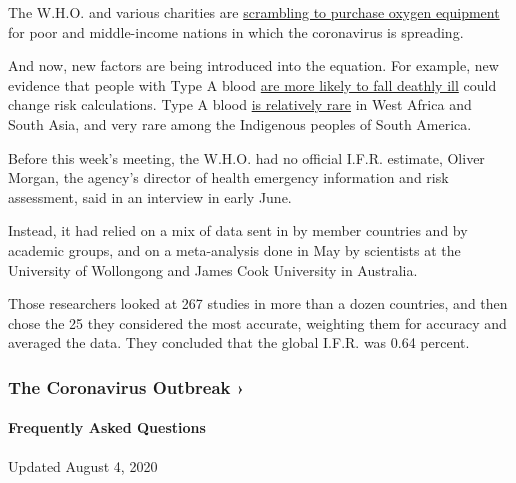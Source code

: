 The W.H.O. and various charities are
\href{https://www.nytimes3xbfgragh.onion/2020/06/23/health/coronavirus-oxygen-africa.html}{scrambling
to purchase oxygen equipment} for poor and middle-income nations in
which the coronavirus is spreading.

And now, new factors are being introduced into the equation. For
example, new evidence that people with Type A blood
\href{https://www.nytimes3xbfgragh.onion/2020/06/03/health/coronavirus-blood-type-genetics.html}{are
more likely to fall deathly ill} could change risk calculations. Type A
blood
\href{https://en.wikipedia.org/wiki/Blood_type_distribution_by_country}{is
relatively rare} in West Africa and South Asia, and very rare among the
Indigenous peoples of South America.

Before this week's meeting, the W.H.O. had no official I.F.R. estimate,
Oliver Morgan, the agency's director of health emergency information and
risk assessment, said in an interview in early June.

Instead, it had relied on a mix of data sent in by member countries and
by academic groups, and on a meta-analysis done in May by scientists at
the University of Wollongong and James Cook University in Australia.

Those researchers looked at 267 studies in more than a dozen countries,
and then chose the 25 they considered the most accurate, weighting them
for accuracy and averaged the data. They concluded that the global
I.F.R. was 0.64 percent.

\href{https://www.nytimes3xbfgragh.onion/news-event/coronavirus?action=click\&pgtype=Article\&state=default\&region=MAIN_CONTENT_3\&context=storylines_faq}{}

\hypertarget{the-coronavirus-outbreak-}{%
\subsubsection{The Coronavirus Outbreak
›}\label{the-coronavirus-outbreak-}}

\hypertarget{frequently-asked-questions}{%
\paragraph{Frequently Asked
Questions}\label{frequently-asked-questions}}

Updated August 4, 2020

